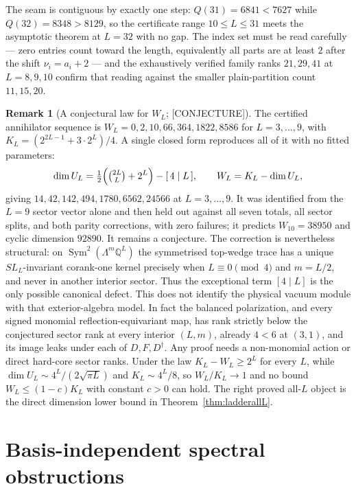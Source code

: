 \documentclass[11pt]{article}
\theoremstyle{definition}
\newtheorem{remark}[theorem]{Remark}
\newcommand{\Qb}{\mathbb{Q}}
\begin{document}
The seam is contiguous by exactly one step: $Q(31)=6841<7627$ while $Q(32)=8348>8129$, so the
certificate range $10\le L\le31$ meets the asymptotic theorem at $L=32$ with no gap. The index set
must be read carefully --- zero entries count toward the length, equivalently all parts are at least
$2$ after the shift $\nu_i=a_i+2$ --- and the exhaustively verified family ranks $21,29,41$ at
$L=8,9,10$ confirm that reading against the smaller plain-partition count $11,15,20$.

\begin{remark}[A conjectural law for $W_L$; {[CONJECTURE]}]
The certified annihilator sequence is $W_L=0,2,10,66,364,1822,8586$ for $L=3,\dots,9$, with
$K_L=(2^{2L-1}+3\cdot2^{L})/4$. A single closed form reproduces all of it with no fitted parameters:
\[
\dim U_L=\tfrac12\Bigl(\tbinom{2L}{L}+2^{L}\Bigr)-[\,4\mid L\,],\qquad W_L=K_L-\dim U_L ,
\]
giving $14,42,142,494,1780,6562,24566$ at $L=3,\dots,9$. It was identified from the $L=9$ sector
vector alone and then held out against all seven totals, all sector splits, and both parity
corrections, with zero failures; it predicts $W_{10}=38950$ and cyclic dimension $92890$. It remains
a conjecture. The correction is nevertheless structural: on
$\operatorname{Sym}^2(\Lambda^m\Qb^L)$ the symmetrised top-wedge trace has a unique
$SL_L$-invariant corank-one kernel precisely when $L\equiv0\pmod4$ and $m=L/2$, and never in another
interior sector. Thus the exceptional term $[4\mid L]$ is the only possible canonical defect.
This does not identify the physical vacuum module with that exterior-algebra model. In fact the
balanced polarization, and every signed monomial reflection-equivariant map, has rank strictly below
the conjectured sector rank at every interior $(L,m)$, already $4<6$ at $(3,1)$, and its image leaks
under each of $D,F,D^\dagger$. Any proof needs a non-monomial action or direct hard-core sector ranks.
Under the law $K_L-W_L\ge2^{L}$ for every $L$, while
$\dim U_L\sim4^{L}/(2\sqrt{\pi L})$ and $K_L\sim4^{L}/8$, so $W_L/K_L\to1$ and no bound
$W_L\le(1-c)K_L$ with constant $c>0$ can hold. The right proved all-$L$ object is the direct
dimension lower bound in Theorem~\ref{thm:ladderallL}.
\end{remark}



\section{Basis-independent spectral obstructions}\label{sec:spectral}
\end{document}
